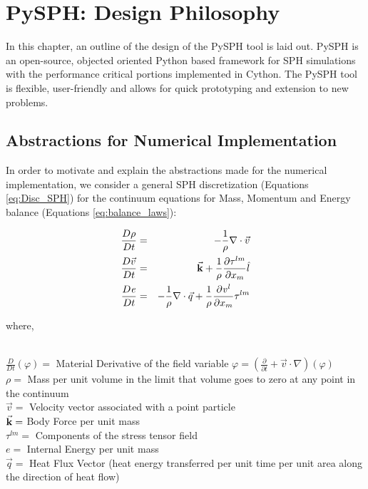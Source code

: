 \chapter{PySPH: Design Philosophy}

In this chapter, an outline of the design of the PySPH \cite{prabhu_puri} tool is laid out. PySPH is an open-source, objected oriented Python based framework for SPH simulations with the performance critical portions implemented in Cython. The PySPH tool is flexible, user-friendly and allows for quick prototyping and extension to new problems.

\section{Abstractions for Numerical Implementation}

In order to motivate and explain the abstractions made for the numerical implementation, we consider a general SPH discretization (Equations \eqref{eq:Disc_SPH}) for the continuum equations for Mass, Momentum and Energy balance (Equations \eqref{eq:balance_laws}):

\begin{eqnarray} \label{eq:balance_laws}
\frac{D\rho}{Dt} &=& -\frac{1}{\rho} \nabla \cdot \vec{v} \nonumber \\
\frac{D{\vec{v}}}{Dt}&=&\vec{{\bf{k}}} + \frac{1}{\rho} \frac{\partial \tau^{lm}}{\partial x_m} \hat{l} \\
\frac{D{\it{e}}}{Dt}&=& -\frac{1}{\rho}\nabla \cdot \vec{q} + \frac{1}{\rho}\frac{\partial {\it{v}^{l}} }{\partial x_m}\tau^{lm} \nonumber
\end{eqnarray}

{\raggedright{where,}}\\
$\frac{D}{Dt}(\varphi) = $ Material Derivative of the field variable $\varphi = \left(\frac{\partial}{\partial t} + \vec{v}\cdot\nabla\right)(\varphi)$ \\
$\rho = $ Mass per unit volume in the limit that volume goes to zero at any point in the continuum\\
$\vec{v} = $ Velocity vector associated with a point particle\\
$\vec{{\bf{k}}} = $ Body Force per unit mass\\
$\tau^{lm} = $ Components of the stress tensor field\\
$e = $ Internal Energy per unit mass\\
$\vec{q} = $ Heat Flux Vector (heat energy transferred per unit time per unit area along the direction of heat flow) 

